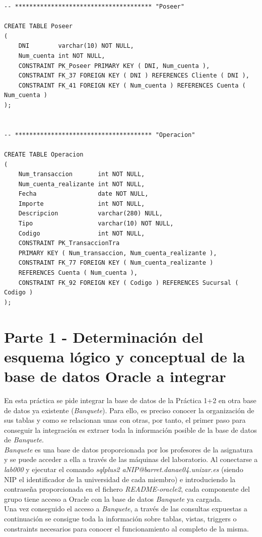 \documentclass{article}
\begin{document}
\begin{lstlisting}
-- ************************************** "Poseer"

CREATE TABLE Poseer
(
    DNI        varchar(10) NOT NULL,
    Num_cuenta int NOT NULL,
    CONSTRAINT PK_Poseer PRIMARY KEY ( DNI, Num_cuenta ),
    CONSTRAINT FK_37 FOREIGN KEY ( DNI ) REFERENCES Cliente ( DNI ),
    CONSTRAINT FK_41 FOREIGN KEY ( Num_cuenta ) REFERENCES Cuenta ( Num_cuenta )
);


-- ************************************** "Operacion"

CREATE TABLE Operacion
(
    Num_transaccion       int NOT NULL,
    Num_cuenta_realizante int NOT NULL,
    Fecha                 date NOT NULL,
    Importe               int NOT NULL,
    Descripcion           varchar(280) NULL,
    Tipo                  varchar(10) NOT NULL,
    Codigo                int NOT NULL,
    CONSTRAINT PK_TransaccionTra 
    PRIMARY KEY ( Num_transaccion, Num_cuenta_realizante ),
    CONSTRAINT FK_77 FOREIGN KEY ( Num_cuenta_realizante ) 
    REFERENCES Cuenta ( Num_cuenta ),
    CONSTRAINT FK_92 FOREIGN KEY ( Codigo ) REFERENCES Sucursal ( Codigo )
);
\end{lstlisting}

\section{Parte 1 - Determinación del esquema lógico y conceptual de la base de datos Oracle a integrar}

En esta práctica se pide integrar la base de datos de la Práctica 1+2 en otra base de datos ya existente (\emph{Banquete}). Para ello, es preciso conocer la organización de sus tablas y como se relacionan unas con otras, por tanto, el primer paso para conseguir la integración es extraer toda la información posible de la base de datos de \emph{Banquete}.\\
\emph{Banquete} es una base de datos proporcionada por los profesores de la asignatura y se puede acceder a ella a través de las máquinas del laboratorio. Al conectarse a \emph{lab000} y ejecutar el comando \emph{sqlplus2 aNIP@barret.danae04.unizar.es} (siendo NIP el identificador de la universidad de cada miembro) e introduciendo la contraseña proporcionada en el fichero \emph{README-oracle2}, cada componente del grupo tiene acceso a Oracle con la base de datos \emph{Banquete} ya cargada.\\
Una vez conseguido el acceso a \emph{Banquete}, a través de las consultas expuestas a continuación se consigue toda la información sobre tablas, vistas, triggers o constraints necesarios para conocer el funcionamiento al completo de la misma. 
\end{document}
